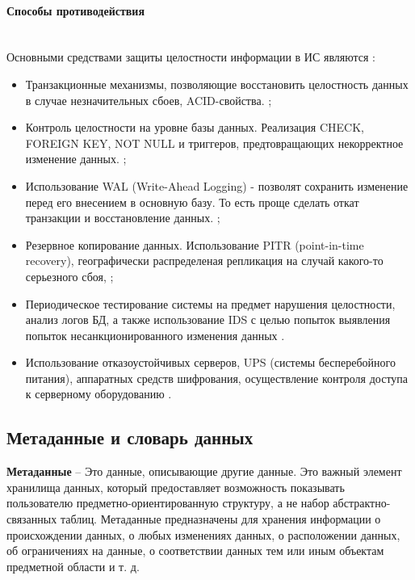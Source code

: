 \paragraph{Способы противодействия} ~\\

Основными средствами защиты целостности информации в ИС являются \autocite{Pirogov2009}:
\begin{itemize}
    \item Транзакционные механизмы, позволяющие восстановить целостность данных в случае незначительных сбоев, ACID-свойства. \autocite{worksol1, DBtest};
    \item Контроль целостности на уровне базы данных. Реализация CHECK, FOREIGN KEY, NOT NULL и триггеров, предтовращающих некорректное изменение данных. \autocite{flenovinfo};
    \item Использование WAL (Write-Ahead Logging) - позволят сохранить изменение перед его внесением в основную базу. То есть проще сделать откат транзакции и восстановление данных. \autocite{WALintro};
    \item Резервное копирование данных. Использование PITR (point-in-time recovery), географически распределеная репликация на случай какого-то серьезного сбоя, \autocite{PITRintro};
    \item Периодическое тестирование системы на предмет нарушения целостности, анализ логов БД, а также использование IDS с целью попыток выявления попыток несанкционированного изменения данных \autocite{DBtest}.
    \item Использование отказоустойчивых серверов, UPS (системы бесперебойного питания), аппаратных средств шифрования, осуществление контроля доступа к серверному оборудованию \autocite{tolerance1, tolerance2}.

\end{itemize}

\subsection{Метаданные и словарь данных}

\begin{grayquote}
	\textbf{Метаданные} -- Это данные, описывающие другие данные. Это важный элемент хранилища данных, который предоставляет возможность показывать пользователю предметно-ориентированную структуру, а не набор абстрактно-связанных таблиц. Метаданные предназначены для хранения информации о происхождении данных, о любых изменениях данных, о расположении данных, об ограничениях на данные, о соответствии данных тем или иным объектам предметной области и т. д. \autocite{Pirogov2009}
\end{grayquote}

